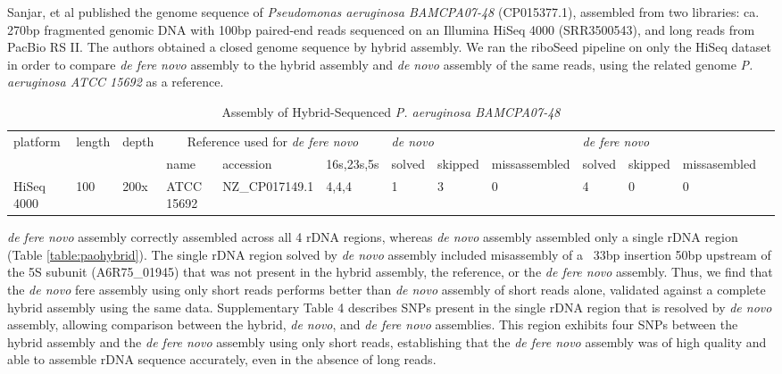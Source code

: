 \documentclass[10pt]{article}
\makeatletter
\newcommand{\cmidrules}[1]{%
  \noalign{%
    \global\MD@cmidrules={}%
    \toks@={\cmidrule(l{.3\tabcolsep}r{.3\tabcolsep})}%
    \count@=\z@
    \loop\ifnum\count@<#1\relax
      \advance\count@\@ne
      \edef\MD@temp{\the\toks@{\the\count@-\the\count@}}%
      \global\MD@cmidrules\expandafter{\the\expandafter\MD@cmidrules\MD@temp}%
    \repeat
  }%
  \the\MD@cmidrules
}
\makeatother
\begin{document}
\begin{linenumbers}
Sanjar, et al published the genome sequence of \textit{Pseudomonas aeruginosa BAMCPA07-48} (CP015377.1)\cite{Sanjar2016}, assembled from two libraries: ca. 270bp fragmented genomic DNA with 100bp paired-end reads sequenced on an Illumina HiSeq 4000 (SRR3500543), and long reads from PacBio RS II. The authors obtained a closed genome sequence by hybrid assembly. We ran the riboSeed pipeline on only the HiSeq dataset in order to compare \textit{de fere novo} assembly to the hybrid assembly and \textit{de novo} assembly of the same reads, using the related genome \textit{P. aeruginosa ATCC 15692} as a reference.

\begin{table}[!h]
  \centering

  \caption{Assembly of Hybrid-Sequenced \textit{P. aeruginosa BAMCPA07-48}}
  \label{paohybrid}
  \begin{tabular}{lllllllllllll}
    \toprule
     \multirow{2}{*}{platform} & \multirow{2}{*}{length} & \multirow{2}{*}{depth} & \multicolumn{3}{c}{Reference used for \textit{de fere novo}} &  \multicolumn{3}{l}{\textit{de novo}}  & \multicolumn{3}{l}{\textit{de fere novo}} &  \\
    \cline{4-6} \cline{8-9} \cline{12-12}  &  &    & name & accession & 16s,23s,5s &  solved & skipped & missassembled   & solved & skipped & missasembled &  \\
    \cmidrules{13}
    HiSeq 4000 & 100 & 200x & ATCC 15692 & NZ\_CP017149.1 & 4,4,4   & 1 & 3 & 0 &   4 & 0 & 0 & \\
    \bottomrule
  \end{tabular}
\end{table}



\textit{de fere novo} assembly correctly assembled across all 4 rDNA regions, whereas \textit{de novo} assembly assembled only a single rDNA region (Table \ref{table:paohybrid}). The single rDNA region solved by \textit{de novo} assembly included misassembly of a ~33bp insertion 50bp upstream of the 5S subunit (A6R75\_01945) that was not present in the hybrid assembly, the reference, or the \textit{de fere novo} assembly. Thus, we find that the \textit{de novo} fere assembly using only short reads performs better than \textit{de novo} assembly of short reads alone, validated against a complete hybrid assembly using the same data. Supplementary Table 4 describes SNPs present in the single rDNA region that is resolved by \textit{de novo} assembly, allowing comparison between the hybrid, \textit{de novo}, and \textit{de fere novo} assemblies. This region exhibits four SNPs between the hybrid assembly and the \textit{de fere novo} assembly using only short reads, establishing that the \textit{de fere novo} assembly was of high quality and able to assemble rDNA sequence accurately, even in the absence of long reads.



\end{linenumbers}
\end{document}
